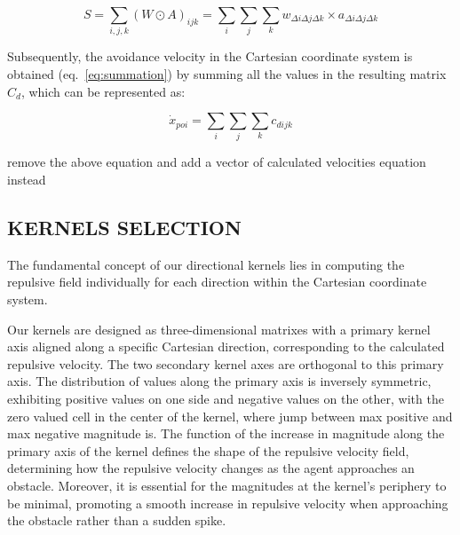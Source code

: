 \documentclass[letterpaper, 10 pt, conference]{ieeeconf}  %
\begin{document}

\begin{equation}
	S = \sum_{i,j,k} (W \odot A)_{ijk} = \sum_{i}\sum_{j}\sum_{k} w_{\Delta i \Delta j \Delta k} \times  a_{\Delta i \Delta j \Delta k}
\end{equation}

Subsequently, the avoidance velocity in the Cartesian coordinate system is obtained (eq.~\ref{eq:summation}) by summing all the values in the resulting matrix $C_d$, which can be represented as:

\begin{equation}
	\dot{x}_{poi} = \sum_{i}\sum_{j}\sum_{k} c_{dijk} 
	\label{eq:summation}
\end{equation}

\alert{remove the above equation and add a vector of calculated velocities equation instead}




\subsection{KERNELS SELECTION}

The fundamental concept of our directional kernels lies in computing the repulsive field individually for each direction within the Cartesian coordinate system. 

Our kernels are designed as three-dimensional matrixes with a primary kernel axis aligned along a specific Cartesian direction, corresponding to the calculated repulsive velocity. The two secondary kernel axes are orthogonal to this primary axis. The distribution of values along the primary axis is inversely symmetric, exhibiting positive values on one side and negative values on the other, with the zero valued cell in the center of the kernel, where jump between max positive and max negative magnitude is. The function of the increase in magnitude along the primary axis of the kernel defines the shape of the repulsive velocity field, determining how the repulsive velocity changes as the agent approaches an obstacle. Moreover, it is essential for the magnitudes at the kernel's periphery to be minimal, promoting a smooth increase in repulsive velocity when approaching the obstacle rather than a sudden spike.
\end{document}
